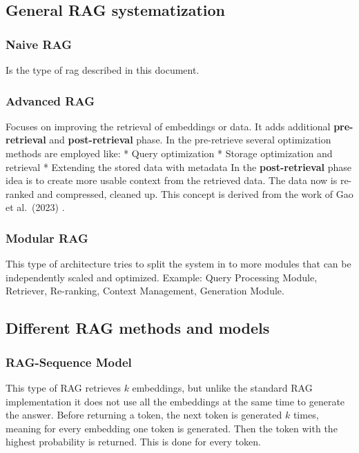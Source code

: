 \documentclass{wseas}
\begin{document}
\subsection{General RAG
systematization}

\subsubsection{Naive RAG}

Is the type of rag described in this document.

\subsubsection{Advanced RAG}

Focuses on improving the retrieval of embeddings or data. It adds
additional \textbf{pre-retrieval} and \textbf{post-retrieval} phase. In
the pre-retrieve several optimization methods are employed like: 
* Query
optimization * Storage optimization and retrieval * Extending the stored
data with metadata In the \textbf{post-retrieval} phase idea is to
create more usable context from the retrieved data. The data now is
re-ranked and compressed, cleaned up. This concept is derived from the
work of Gao et al.~(2023) \cite{cite4}.

\subsubsection{Modular RAG}

This type of architecture tries to split the system in to more modules
that can be independently scaled and optimized. Example: Query
Processing Module, Retriever, Re-ranking, Context Management, Generation
Module.

\subsection{Different RAG methods and
models}

\subsubsection{RAG-Sequence Model}

This type of RAG retrieves \(k\) embeddings, but unlike the standard RAG
implementation it does not use all the embeddings at the same time to
generate the answer. Before returning a token, the next token is
generated \(k\) times, meaning for every embedding one token is
generated. Then the token with the highest probability is returned. This
is done for every token.
\end{document}
